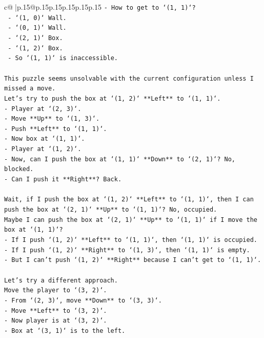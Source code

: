 \documentclass{article}
\begin{document}
{\begin{supertabular}{c@{$\;$}|p{.15\linewidth}@{}p{.15\linewidth}p{.15\linewidth}p{.15\linewidth}p{.15\linewidth}p{.15\linewidth}}
{{{\texttt{{-} How to get to `(1, 1)`?} \\
\texttt{  {-} `(1, 0)` Wall.} \\
\texttt{  {-} `(0, 1)` Wall.} \\
\texttt{  {-} `(2, 1)` Box.} \\
\texttt{  {-} `(1, 2)` Box.} \\
\texttt{  {-} So `(1, 1)` is inaccessible.} \\
\\ 
\texttt{This puzzle seems unsolvable with the current configuration unless I missed a move.} \\
\texttt{Let's try to push the box at `(1, 2)` **Left** to `(1, 1)`.} \\
\texttt{{-} Player at `(2, 3)`.} \\
\texttt{{-} Move **Up** to `(1, 3)`.} \\
\texttt{{-} Push **Left** to `(1, 1)`.} \\
\texttt{{-} Now box at `(1, 1)`.} \\
\texttt{{-} Player at `(1, 2)`.} \\
\texttt{{-} Now, can I push the box at `(1, 1)` **Down** to `(2, 1)`? No, blocked.} \\
\texttt{{-} Can I push it **Right**? Back.} \\
\\ 
\texttt{Wait, if I push the box at `(1, 2)` **Left** to `(1, 1)`, then I can push the box at `(2, 1)` **Up** to `(1, 1)`? No, occupied.} \\
\texttt{Maybe I can push the box at `(2, 1)` **Up** to `(1, 1)` if I move the box at `(1, 1)`?} \\
\texttt{{-} If I push `(1, 2)` **Left** to `(1, 1)`, then `(1, 1)` is occupied.} \\
\texttt{{-} If I push `(1, 2)` **Right** to `(1, 3)`, then `(1, 1)` is empty.} \\
\texttt{{-} But I can't push `(1, 2)` **Right** because I can't get to `(1, 1)`.} \\
\\ 
\texttt{Let's try a different approach.} \\
\texttt{Move the player to `(3, 2)`.} \\
\texttt{{-} From `(2, 3)`, move **Down** to `(3, 3)`.} \\
\texttt{{-} Move **Left** to `(3, 2)`.} \\
\texttt{{-} Now player is at `(3, 2)`.} \\
\texttt{{-} Box at `(3, 1)` is to the left.} \\
}}}
\end{supertabular}}
\end{document}
